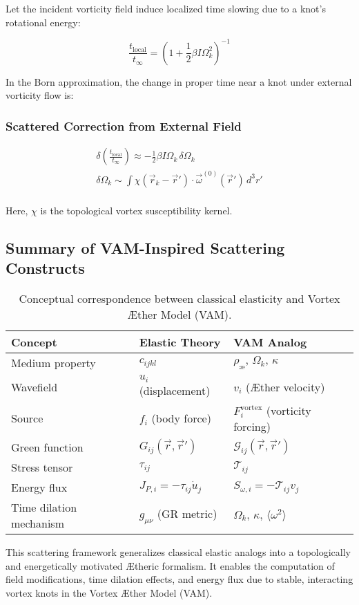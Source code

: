 Let the incident vorticity field induce localized time slowing due to a knot’s rotational energy:

\[
\frac{t_{\text{local}}}{t_{\infty}} = \left(1 + \frac{1}{2} \beta I \Omega_k^2 \right)^{-1}
\]

In the Born approximation, the change in proper time near a knot under external vorticity flow is:

\subsubsection*{Scattered Correction from External Field}

\begin{gather*}
    \delta \left( \frac{t_{\text{local}}}{t_{\infty}} \right) \approx - \frac{1}{2} \beta I \Omega_k \, \delta \Omega_k\\
    \delta \Omega_k \sim \int \chi(\vec{r}_k - \vec{r}') \cdot \vec{\omega}^{(0)}(\vec{r}') \, d^3r'\\
\end{gather*}

Here, \(\chi\) is the topological vortex susceptibility kernel.



\subsection{Summary of VAM-Inspired Scattering Constructs}


\begin{table}[htbp]
    \centering
    \begin{tabular}{lll}
        \toprule
        \textbf{Concept} & \textbf{Elastic Theory} & \textbf{VAM Analog} \\
        \midrule
        Medium property & \( c_{ijkl} \) & \( \rho_{\text{\ae}},\, \Omega_k,\, \kappa \) \\
        Wavefield & \( u_i \) (displacement) & \( v_i \) (Æther velocity) \\
        Source & \( f_i \) (body force) & \( F_i^{\text{vortex}} \) (vorticity forcing) \\
        Green function & \( G_{ij}(\vec{r}, \vec{r}') \) & \( \mathcal{G}_{ij}(\vec{r}, \vec{r}') \) \\
        Stress tensor & \( \tau_{ij} \) & \( \mathcal{T}_{ij} \) \\
        Energy flux & \( J_{P,i} = -\tau_{ij} \dot{u}_j \) & \( S_{\omega,i} = -\mathcal{T}_{ij} v_j \) \\
        Time dilation mechanism & \( g_{\mu\nu} \) (GR metric) & \( \Omega_k,\, \kappa,\, \langle \omega^2 \rangle \) \\
        \bottomrule
    \end{tabular}
    \caption{Conceptual correspondence between classical elasticity and Vortex Æther Model (VAM).}
    \label{tab:elastic-vam-analogy}
\end{table}



This scattering framework generalizes classical elastic analogs into a topologically and energetically motivated Ætheric formalism. It enables the computation of field modifications, time dilation effects, and energy flux due to stable, interacting vortex knots in the Vortex Æther Model (VAM).